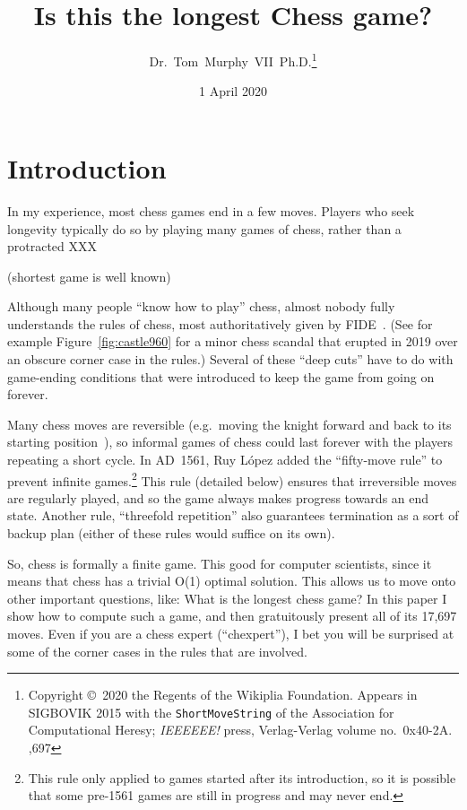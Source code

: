 \documentclass[twocolumn]{article}
\begin{document}
 

\title{Is this the longest Chess game?}
\author{Dr.~Tom~Murphy~VII~Ph.D.\thanks{
Copyright \copyright\ 2020 the Regents of the Wikiplia
Foundation. Appears in SIGBOVIK 2015 with the {\tt ShortMoveString} of the
Association for Computational Heresy; {\em IEEEEEE!} press,
Verlag-Verlag volume no.~0x40-2A.
,697
}
}

\renewcommand\>{$>$}
\newcommand\<{$<$}

\date{1 April 2020}

\maketitle

\section{Introduction}

In my experience, most chess games end in a few moves. Players who
seek longevity typically do so by playing many games of chess, rather
than a protracted XXX

(shortest game is well known)

Although many people ``know how to play'' chess, almost nobody fully
understands the rules of chess, most authoritatively given by
FIDE~\cite{fiderules}. (See for example Figure~\ref{fig:castle960} for
a minor chess scandal that erupted in 2019 over an obscure corner case
in the rules.) Several of these ``deep cuts'' have to do with game-ending
conditions that were introduced to keep the game from going on forever.

Many chess moves are reversible (e.g.~moving the knight forward and
back to its starting position~\cite{survival}), so informal games of
chess could last forever with the players repeating a short cycle. In
AD~1561, Ruy L\'opez added the ``fifty-move rule'' to prevent infinite
games.\footnote{This rule only applied to games started after its
  introduction, so it is possible that some pre-1561 games are still
  in progress and may never end.} This rule (detailed below) ensures
that irreversible moves are regularly played, and so the game always
makes progress towards an end state. Another rule, ``threefold
repetition'' also guarantees termination as a sort of backup plan
(either of these rules would suffice on its own).

So, chess is formally a finite game. This good for computer
scientists, since it means that chess has a trivial O(1) optimal
solution. This allows us to move onto other important questions, like:
What is the longest chess game? In this paper I show how to compute
such a game, and then gratuitously present all of its 17,697 
moves. Even if you are a chess expert (``chexpert''), I bet you
will be surprised at some of the corner cases in the rules that are
involved.
\end{document}
